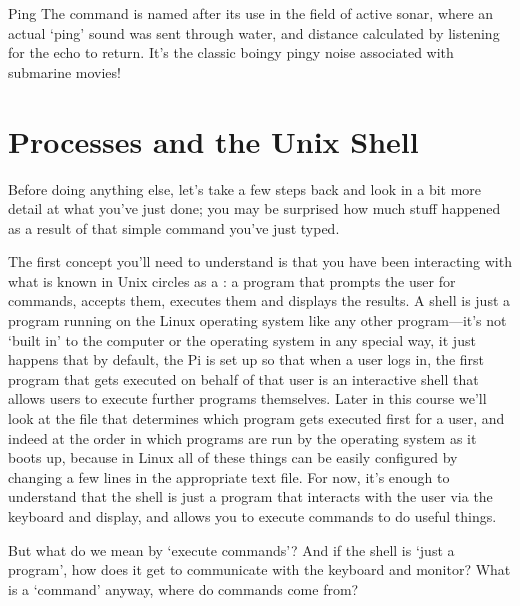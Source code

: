 \begin{diversion}{Ping}
  The  command is named after its use in the field of active sonar, where an actual `ping' sound was sent through water, and distance calculated by listening for the echo to return. It's the classic boingy pingy noise associated with submarine movies! 
\end{diversion}

\section{Processes and the Unix Shell}

Before doing anything else, let's take a few steps back and look in a bit more detail at what you've just done; you may be surprised how much stuff happened as a result of that simple command you've just typed. 

The first concept you'll need to understand is that you have been
interacting with what is known in Unix circles as a : a program that prompts
the user for commands, accepts them, executes them and displays the
results. A shell is just a program running on the Linux operating system like any other program---it's not `built in' to the computer or the operating system in any special way, it just happens that by default, the Pi is set up so that when a user logs in, the first program that gets executed on behalf of that user is an interactive shell that allows users to execute further programs themselves. Later in this course we'll look at the file that determines which program gets executed first for a user, and indeed at the order in which programs are run by the operating system as it boots up, because in Linux all of these things can be easily configured by changing a few lines in the appropriate text file. For now, it's enough to understand that the shell is just a program that interacts with the user via the keyboard and display, and allows you to execute commands to do useful things.

But what do we mean by `execute commands'? And if the shell is `just a program', how does it get to communicate with the keyboard and monitor? What is a `command' anyway, where do commands come from?

